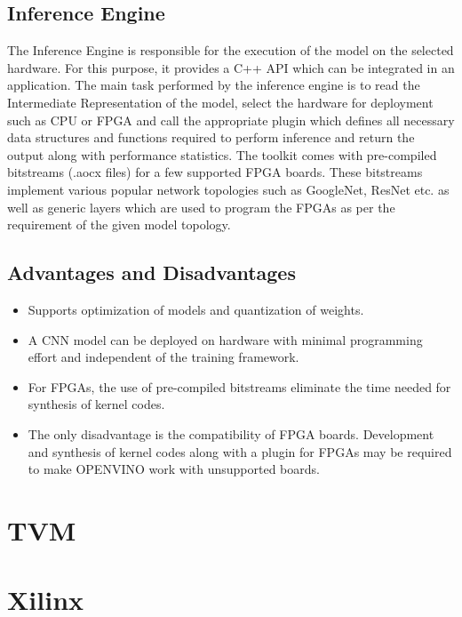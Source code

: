 \documentclass[titlepage]{report}
\begin{document}
 \subsection{Inference Engine}
 The Inference Engine is responsible for the execution of the model on the selected hardware. For this purpose, it provides a C++ API which can be integrated in an application. The main task performed by the inference engine is to read the Intermediate Representation of the model, select the hardware for deployment such as CPU or FPGA and call the appropriate plugin which defines all necessary data structures and functions required to perform inference and return the output along with performance statistics. 
 The toolkit comes with pre-compiled bitstreams (.aocx files) for a few supported FPGA boards. These bitstreams implement various popular network topologies such as GoogleNet, ResNet etc. as well as generic layers which are used to program the FPGAs as per the requirement of the given model topology. 
 
 \subsection{Advantages and Disadvantages}
  
 \begin{itemize}
 \item Supports optimization of models and quantization of weights.
 \item A CNN model can be deployed on hardware with minimal programming effort and independent of the training framework.
 \item For FPGAs, the use of pre-compiled bitstreams eliminate the time needed for synthesis of kernel codes.
 \item The only disadvantage is the compatibility of FPGA boards. Development and synthesis of kernel codes along with a plugin for FPGAs may be required to make OPENVINO work with unsupported boards. 
 
 \end{itemize}

\section{TVM}
\lipsum[3]

\section{Xilinx}
\lipsum[3]
\end{document}

